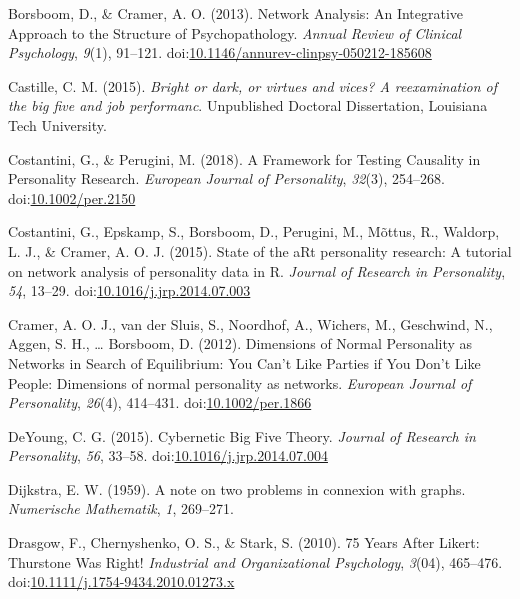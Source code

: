 \documentclass[man]{apa6}
\begin{document}
\hypertarget{refs}{}
\hypertarget{ref-borsboomNetworkAnalysisIntegrative2013}{}
Borsboom, D., \& Cramer, A. O. (2013). Network Analysis: An Integrative
Approach to the Structure of Psychopathology. \emph{Annual Review of
Clinical Psychology}, \emph{9}(1), 91--121.
doi:\href{https://doi.org/10.1146/annurev-clinpsy-050212-185608}{10.1146/annurev-clinpsy-050212-185608}

\hypertarget{ref-castilleBrightDarkVirtues2015}{}
Castille, C. M. (2015). \emph{Bright or dark, or virtues and vices? A
reexamination of the big five and job performanc}. Unpublished Doctoral
Dissertation, Louisiana Tech University.

\hypertarget{ref-costantiniFrameworkTestingCausality2018}{}
Costantini, G., \& Perugini, M. (2018). A Framework for Testing
Causality in Personality Research. \emph{European Journal of
Personality}, \emph{32}(3), 254--268.
doi:\href{https://doi.org/10.1002/per.2150}{10.1002/per.2150}

\hypertarget{ref-costantiniStateARtPersonality2015}{}
Costantini, G., Epskamp, S., Borsboom, D., Perugini, M., Mõttus, R.,
Waldorp, L. J., \& Cramer, A. O. J. (2015). State of the aRt personality
research: A tutorial on network analysis of personality data in R.
\emph{Journal of Research in Personality}, \emph{54}, 13--29.
doi:\href{https://doi.org/10.1016/j.jrp.2014.07.003}{10.1016/j.jrp.2014.07.003}

\hypertarget{ref-cramerDimensionsNormalPersonality2012}{}
Cramer, A. O. J., van der Sluis, S., Noordhof, A., Wichers, M.,
Geschwind, N., Aggen, S. H., \ldots{} Borsboom, D. (2012). Dimensions of
Normal Personality as Networks in Search of Equilibrium: You Can't Like
Parties if You Don't Like People: Dimensions of normal personality as
networks. \emph{European Journal of Personality}, \emph{26}(4),
414--431. doi:\href{https://doi.org/10.1002/per.1866}{10.1002/per.1866}

\hypertarget{ref-deyoungCyberneticBigFive2015}{}
DeYoung, C. G. (2015). Cybernetic Big Five Theory. \emph{Journal of
Research in Personality}, \emph{56}, 33--58.
doi:\href{https://doi.org/10.1016/j.jrp.2014.07.004}{10.1016/j.jrp.2014.07.004}

\hypertarget{ref-dijkstraNoteTwoProblems1959}{}
Dijkstra, E. W. (1959). A note on two problems in connexion with graphs.
\emph{Numerische Mathematik}, \emph{1}, 269--271.

\hypertarget{ref-drasgow75YearsLikert2010}{}
Drasgow, F., Chernyshenko, O. S., \& Stark, S. (2010). 75 Years After
Likert: Thurstone Was Right! \emph{Industrial and Organizational
Psychology}, \emph{3}(04), 465--476.
doi:\href{https://doi.org/10.1111/j.1754-9434.2010.01273.x}{10.1111/j.1754-9434.2010.01273.x}
\end{document}

